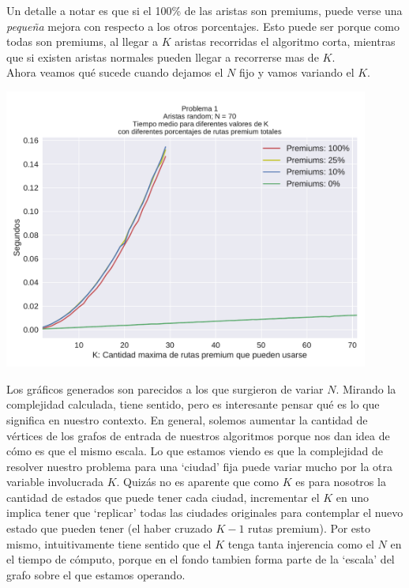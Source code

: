 Un detalle a notar es que si el 100\% de las aristas son premiums, puede verse una \textit{pequeña} mejora con respecto a los otros porcentajes. Esto puede ser porque como todas son premiums, al llegar a $K$ aristas recorridas el algoritmo corta, mientras que si existen aristas normales pueden llegar a recorrerse mas de $K$. \\

Ahora veamos qué sucede cuando dejamos el $N$ fijo y vamos variando el $K$.

{\centering
  \includegraphics[width=0.9\textwidth]{imagenes/problema1/nfijo.pdf} \\
}

Los gráficos generados son parecidos a los que surgieron de variar $N$. Mirando la complejidad calculada, tiene sentido, pero es interesante pensar qué es lo que significa en nuestro contexto. En general, solemos aumentar la cantidad de vértices de los grafos de entrada de nuestros algoritmos porque nos dan idea de cómo es que el mismo escala. Lo que estamos viendo es que la complejidad de resolver nuestro problema para una `ciudad' fija puede variar mucho por la otra variable involucrada $K$. Quizás no es aparente que como $K$ es para nosotros la cantidad de estados que puede tener cada ciudad, incrementar el $K$ en uno implica tener que `replicar' todas las ciudades originales para contemplar el nuevo estado que pueden tener (el haber cruzado $K-1$ rutas premium). Por esto mismo, intuitivamente tiene sentido que el $K$ tenga tanta injerencia como el $N$ en el tiempo de cómputo, porque en el fondo tambien forma parte de la `escala' del grafo sobre el que estamos operando.